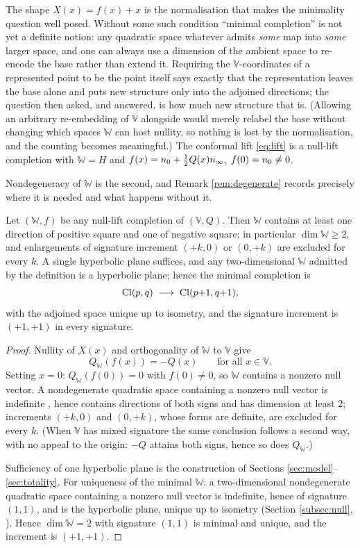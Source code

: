 The shape $X(x) = f(x) + x$ is the normalisation that makes the minimality question well posed. Without some such condition ``minimal completion'' is not yet a definite notion: any quadratic space whatever admits \emph{some} map into \emph{some} larger space, and one can always use a dimension of the ambient space to re-encode the base rather than extend it. Requiring the $\mathbb{V}$-coordinates of a represented point to be the point itself says exactly that the representation leaves the base alone and puts new structure only into the adjoined directions; the question then asked, and answered, is how much new structure that is. (Allowing an arbitrary re-embedding of $\mathbb{V}$ alongside would merely relabel the base without changing which spaces $\mathbb{W}$ can host nullity, so nothing is lost by the normalisation, and the counting becomes meaningful.) The conformal lift \eqref{eq:lift} is a null-lift completion with $\mathbb{W} = H$ and $f(x) = n_0 + \tfrac12 Q(x)n_\infty$, $f(0) = n_0 \neq 0$.

Nondegeneracy of $\mathbb{W}$ is the second, and Remark \ref{rem:degenerate} records precisely where it is needed and what happens without it.

\begin{theorem}[Minimality]\label{thm:minimality}
Let $(\mathbb{W}, f)$ be any null-lift completion of $(\mathbb{V}, Q)$. Then $\mathbb{W}$ contains at least one direction of positive square and one of negative square; in particular $\dim \mathbb{W} \geq 2$, and enlargements of signature increment $(+k, 0)$ or $(0, +k)$ are excluded for every $k$. A single hyperbolic plane suffices, and any two-dimensional $\mathbb{W}$ admitted by the definition is a hyperbolic plane; hence the minimal completion is
\[
\mathrm{Cl}(p,q) \;\longrightarrow\; \mathrm{Cl}(p{+}1, q{+}1),
\]
with the adjoined space unique up to isometry, and the signature increment is $(+1,+1)$ in every signature.
\end{theorem}

\begin{proof}
Nullity of $X(x)$ and orthogonality of $\mathbb{W}$ to $\mathbb{V}$ give
\[
Q_{\mathbb{W}}(f(x)) = -Q(x) \qquad \text{for all } x \in \mathbb{V}.
\]
Setting $x = 0$: $Q_{\mathbb{W}}(f(0)) = 0$ with $f(0) \neq 0$, so $\mathbb{W}$ contains a nonzero null vector. A nondegenerate quadratic space containing a nonzero null vector is indefinite \cite{Lam2005}, hence contains directions of both signs and has dimension at least $2$; increments $(+k,0)$ and $(0,+k)$, whose forms are definite, are excluded for every $k$. (When $\mathbb{V}$ has mixed signature the same conclusion follows a second way, with no appeal to the origin: $-Q$ attains both signs, hence so does $Q_{\mathbb{W}}$.)

Sufficiency of one hyperbolic plane is the construction of Sections \ref{sec:model}--\ref{sec:totality}. For uniqueness of the minimal $\mathbb{W}$: a two-dimensional nondegenerate quadratic space containing a nonzero null vector is indefinite, hence of signature $(1,1)$, and is the hyperbolic plane, unique up to isometry (Section \ref{subsec:null}, \cite{Lam2005}). Hence $\dim \mathbb{W} = 2$ with signature $(1,1)$ is minimal and unique, and the increment is $(+1,+1)$.
\end{proof}

